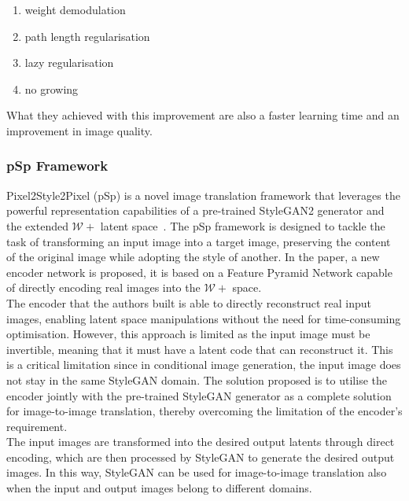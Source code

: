 \begin{enumerate}
\setlength{\itemsep}{1pt}
\setlength{\parskip}{0pt}
\setlength{\parsep}{0pt}
    \item weight demodulation
    \item path length regularisation
    \item lazy regularisation
    \item no growing
\end{enumerate}
What they achieved with this improvement are also a faster learning time and an improvement in image quality.

\subsubsection{pSp Framework}
\label{section:pspFramework}
Pixel2Style2Pixel (pSp) is a novel image translation framework that leverages the powerful representation capabilities of a pre-trained StyleGAN2 generator and the extended $\mathcal{W}+$ latent space~\cite{pSp}. The pSp framework is designed to tackle the task of transforming an input image into a target image, preserving the content of the original image while adopting the style of another.
In the paper, a new encoder network is proposed, it is based on a Feature Pyramid Network capable of directly encoding real images into the $\mathcal{W}+$ space. \\
The encoder that the authors built is able to directly reconstruct real input images, enabling latent space manipulations without the need for time-consuming optimisation. However, this approach is limited as the input image must be invertible, meaning that it must have a latent code that can reconstruct it. This is a critical limitation since in conditional image generation, the input image does not stay in the same StyleGAN domain. The solution proposed is to utilise the encoder jointly with the pre-trained StyleGAN generator as a complete solution for image-to-image translation, thereby overcoming the limitation of the encoder's requirement. \\
The input images are transformed into the desired output latents through direct encoding, which are then processed by StyleGAN to generate the desired output images. In this way, StyleGAN can be used for image-to-image translation also when the input and output images belong to different domains.\\
